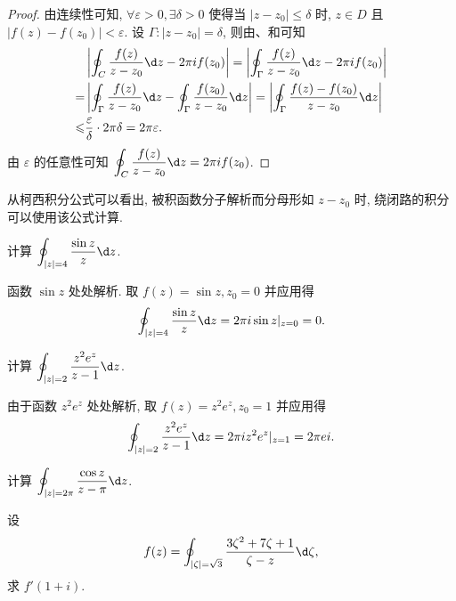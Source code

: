 \begin{proof}
  由连续性可知, $\forall\varepsilon>0,\exists\delta>0$ 使得当 $|z-z_0|\le\delta$ 时, $z\in D$ 且 $|f(z)-f(z_0)|<\varepsilon$.
  设 $\Gamma:|z-z_0|=\delta$, 则由\thmCCC、和\thmGrowUp 可知
  \begin{align*}
    &\abs{\oint_C\frac{f(z)}{z-z_0}\d z-2\pi i f(z_0)}
    =\abs{\oint_\Gamma\frac{f(z)}{z-z_0}\d z-2\pi i f(z_0)}\\
    =&\abs{\oint_\Gamma\frac{f(z)}{z-z_0}\d z-\oint_\Gamma\frac{f(z_0)}{z-z_0}\d z}
    =\abs{\oint_\Gamma\frac{f(z)-f(z_0)}{z-z_0}\d z}\\
    \le&\frac\varepsilon \delta\cdot 2\pi \delta=2\pi \varepsilon.
  \end{align*}
  由 $\varepsilon$ 的任意性可知 
  $\displaystyle\oint_C\frac{f(z)}{z-z_0}\d z=2\pi i f(z_0)$.
\end{proof}

从柯西积分公式可以看出, 被积函数分子解析而分母形如 $z-z_0$ 时, 绕闭路的积分可以使用该公式计算.

\begin{example}
  计算 $\displaystyle\oint_{|z|=4}\frac{\sin z}z\d z$.
\end{example}

\begin{solution}
  函数 $\sin z$ 处处解析.
  取 $f(z)=\sin z, z_0=0$ 并应用\thmCI{}得
  \[
    \oint_{|z|=4}\frac{\sin z}z\d z
    =2\pi i \sin z|_{z=0}=0.
  \]
\end{solution}

\begin{example}
  计算 $\displaystyle\oint_{|z|=2}\frac{z^2e^z}{z-1}\d z$.
\end{example}

\begin{solution}
  由于函数 $z^2e^z$ 处处解析,
  取 $f(z)=z^2e^z, z_0=1$ 并应用\thmCI{}得
  \[
    \oint_{|z|=2}\frac{z^2e^z}{z-1}\d z
    =2\pi i z^2e^z|_{z=1}=2\pi ei.
  \]
\end{solution}

\begin{exercise}
  计算 $\displaystyle\oint_{|z|=2\pi}\frac{\cos z}{z-\pi}\d z$.
\end{exercise}

\begin{example}
  设
  \[
    f(z)=\displaystyle\oint_{|\zeta|=\sqrt3}\frac{3\zeta^2+7\zeta+1}{\zeta-z}\d \zeta,
  \]
  求 $f'(1+i)$.
\end{example}

